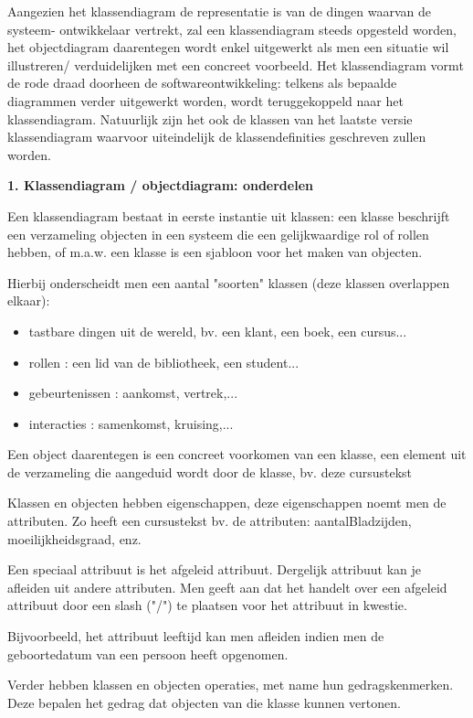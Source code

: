 Aangezien het klassendiagram de representatie is van de dingen waarvan de systeem- ontwikkelaar vertrekt, zal een klassendiagram steeds opgesteld worden, het objectdiagram daarentegen wordt enkel uitgewerkt als men een situatie wil illustreren/ verduidelijken met een concreet voorbeeld.
Het klassendiagram vormt de rode draad doorheen de softwareontwikkeling: telkens als bepaalde diagrammen verder uitgewerkt worden, wordt teruggekoppeld naar het klassendiagram. Natuurlijk zijn het ook de klassen van het laatste versie klassendiagram waarvoor uiteindelijk de klassendefinities geschreven zullen worden.

\textbf{1. Klassendiagram / objectdiagram: onderdelen}

Een klassendiagram bestaat in eerste instantie uit klassen: een klasse beschrijft een verzameling objecten in een systeem die een gelijkwaardige rol of rollen hebben, of m.a.w. een klasse is een sjabloon voor het maken van objecten.

Hierbij onderscheidt men een aantal "soorten" klassen (deze klassen overlappen elkaar):

\begin{itemize}
    \item tastbare dingen uit de wereld, bv. een klant, een boek, een cursus...
    \item rollen : een lid van de bibliotheek, een student... 
    \item gebeurtenissen : aankomst, vertrek,...
    \item interacties : samenkomst, kruising,...
\end{itemize}

Een object daarentegen is een concreet voorkomen van een klasse, een element uit de verzameling die aangeduid wordt door de klasse, bv. deze cursustekst

Klassen en objecten hebben eigenschappen, deze eigenschappen noemt men de attributen. Zo heeft een cursustekst bv. de attributen: aantalBladzijden, moeilijkheidsgraad, enz.

Een speciaal attribuut is het afgeleid attribuut. Dergelijk attribuut kan je afleiden uit andere attributen. Men geeft aan dat het handelt over een afgeleid attribuut door een slash ("/") te plaatsen voor het attribuut in kwestie.

Bijvoorbeeld, het attribuut leeftijd kan men afleiden indien men de geboortedatum van een persoon heeft opgenomen.

Verder hebben klassen en objecten operaties, met name hun gedragskenmerken. Deze bepalen het gedrag dat objecten van die klasse kunnen vertonen.


